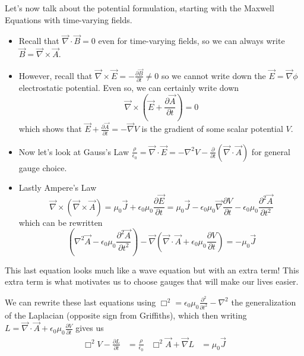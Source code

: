 \documentclass[10pt]{report}
\newcommand{\pd}[2]{\frac{\partial #1}{\partial#2}}
\newcommand{\ptd}[2]{\frac{\partial^2 #1}{\partial#2^2}}
\begin{document}
Let's now talk about the potential formulation, starting with the Maxwell Equations with time-varying fields. 
\begin{itemize}
    \item Recall that $\vec{\nabla} \cdot \vec{B} = 0$ even for time-varying fields, so we can always write $\vec{B} = \vec{\nabla} \times \vec{A}$. 
    \item However, recall that $\vec{\nabla} \times \vec{E} = -\pd{\vec{B}}{t} \neq 0$ so we cannot write down the $\vec{E} = \vec{\nabla} \phi$ electrostatic potential. Even so, we can certainly write down
\begin{equation}
    \vec{\nabla} \times \left( \vec{E} + \pd{\vec{A}}{t} \right) = 0
\end{equation}
which shows that $\vec{E} + \pd{\vec{A}}{t} = -\vec{\nabla} V$ is the gradient of some scalar potential $V$.
    \item Now let's look at Gauss's Law $\frac{\rho}{\epsilon_0} = \vec{\nabla} \cdot \vec{E} = -\nabla^2 V - \pd{}{t}\left( \vec{\nabla} \cdot \vec{A} \right)$ for general gauge choice. 
    \item Lastly Ampere's Law \begin{equation}
            \vec{\nabla} \times (\vec{\nabla} \times \vec{A}) = \mu_0 \vec{J} + \epsilon_0 \mu_0 \pd{\vec{E}}{t} = \mu_0\vec{J} - \epsilon_0 \mu_0 \vec{\nabla} \pd{V}{t} - \epsilon_0 \mu_0 \ptd{\vec{A}}{t}
        \end{equation}
which can be rewritten
\begin{equation}
    \left( \nabla^2 \vec{A} - \epsilon_0 \mu_0 \ptd{\vec{A}}{t} \right) - \vec{\nabla}\left( \vec{\nabla} \cdot \vec{A} + \epsilon_0 \mu_0 \pd{V}{t} \right) = -\mu_0\vec{J}
\end{equation}
\end{itemize}

This last equation looks much like a wave equation but with an extra term! This extra term is what motivates us to choose gauges that will make our lives easier. 

We can rewrite these last equations using $\Box^2 = \epsilon_0 \mu_0 \ptd{}{t} - \nabla^2$ the generalization of the Laplacian (opposite sign from Griffiths), which then writing $L = \vec{\nabla} \cdot \vec{A} + \epsilon_0 \mu_0 \pd{V}{t}$ gives us 
\begin{align}
    \Box^2V - \pd{L}{t} &= \frac{\rho}{\epsilon_0} & \Box^2 \vec{A} + \vec{\nabla}L &= \mu_0 \vec{J}
\end{align}
\end{document}
